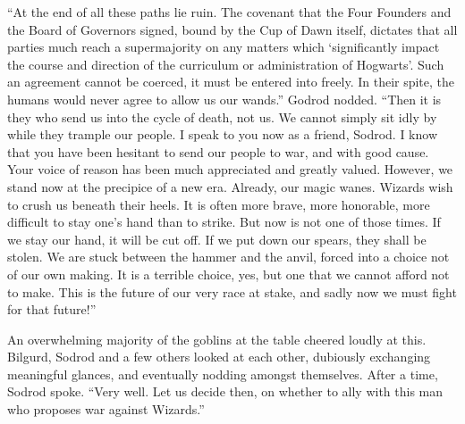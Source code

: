 “At the end of all these paths lie ruin. The covenant that the Four Founders and the Board of Governors signed, bound by the Cup of Dawn itself, dictates that all parties much reach a supermajority on any matters which ‘significantly impact the course and direction of the curriculum or administration of Hogwarts’. Such an agreement cannot be coerced, it must be entered into freely. In their spite, the humans would never agree to allow us our wands.”
\SmallVSpace
Godrod nodded. “Then it is they who send us into the cycle of death, not us. We cannot simply sit idly by while they trample our people. I speak to you now as a friend, Sodrod. I know that you have been hesitant to send our people to war, and with good cause. Your voice of reason has been much appreciated and greatly valued. However, we stand now at the precipice of a new era. Already, our magic wanes. Wizards wish to crush us beneath their heels. It is often more brave, more honorable, more difficult to stay one’s hand than to strike. But now is not one of those times. If we stay our hand, it will be cut off. If we put down our spears, they shall be stolen. We are stuck between the hammer and the anvil, forced into a choice not of our own making. It is a terrible choice, yes, but one that we cannot afford not to make. This is the future of our very race at stake, and sadly now we must fight for that future!”

An overwhelming majority of the goblins at the table cheered loudly at this. Bilgurd, Sodrod and a few others looked at each other, dubiously exchanging meaningful glances, and eventually nodding amongst themselves.
\SmallVSpace
After a time, Sodrod spoke. “Very well. Let us decide then, on whether to ally with this man who proposes war against Wizards.”

